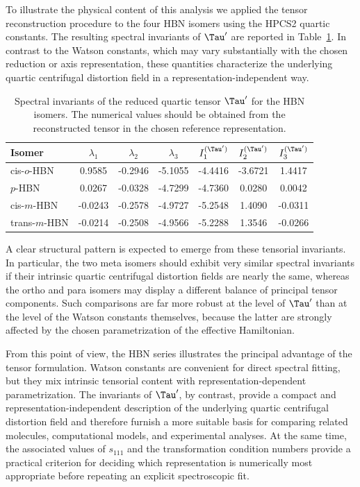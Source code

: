 To illustrate the physical content of this analysis we applied the
tensor reconstruction procedure to the four HBN isomers using the HPCS2
quartic constants.  The resulting spectral invariants of $\Tau'$ are
reported in Table~\ref{table:hbn_tauprime}.  In contrast to the Watson
constants, which may vary substantially with the chosen reduction or
axis representation, these quantities characterize the underlying
quartic centrifugal distortion field in a representation-independent
way.

\begin{table}[h]
\centering
\caption{Spectral invariants of the reduced quartic tensor $\Tau'$ for
the HBN isomers.  The numerical values should be obtained from the
reconstructed tensor in the chosen reference representation.}

\begin{tabular}{lcccccc}
\hline
Isomer & $\lambda_1$ & $\lambda_2$ & $\lambda_3$ & $I_1^{(\Tau')}$ & $I_2^{(\Tau')}$ & $I_3^{(\Tau')}$ \\
\hline
cis-$o$-HBN   & 0.9585 & -0.2946 & -5.1055 & -4.4416 & -3.6721 & 1.4417 \\
$p$-HBN       & 0.0267 & -0.0328 & -4.7299 & -4.7360 & 0.0280 & 0.0042 \\
cis-$m$-HBN   & -0.0243 & -0.2578 & -4.9727 & -5.2548 & 1.4090 & -0.0311 \\
trans-$m$-HBN & -0.0214 & -0.2508 & -4.9566 & -5.2288 & 1.3546 & -0.0266 \\
\hline
\end{tabular}

\label{table:hbn_tauprime}

\end{table}

A clear structural pattern is expected to emerge from these tensorial
invariants.  In particular, the two meta isomers should exhibit very
similar spectral invariants if their intrinsic quartic centrifugal
distortion fields are nearly the same, whereas the ortho and para
isomers may display a different balance of principal tensor components.
Such comparisons are far more robust at the level of $\Tau'$ than at
the level of the Watson constants themselves, because the latter are
strongly affected by the chosen parametrization of the effective
Hamiltonian.

From this point of view, the HBN series illustrates the principal
advantage of the tensor formulation.  Watson constants are convenient
for direct spectral fitting, but they mix intrinsic tensorial content
with representation-dependent parametrization.  The invariants of
$\Tau'$, by contrast, provide a compact and representation-independent
description of the underlying quartic centrifugal distortion field and
therefore furnish a more suitable basis for comparing related
molecules, computational models, and experimental analyses.  At the
same time, the associated values of $s_{111}$ and the transformation
condition numbers provide a practical criterion for deciding which
representation is numerically most appropriate before repeating an
explicit spectroscopic fit.
